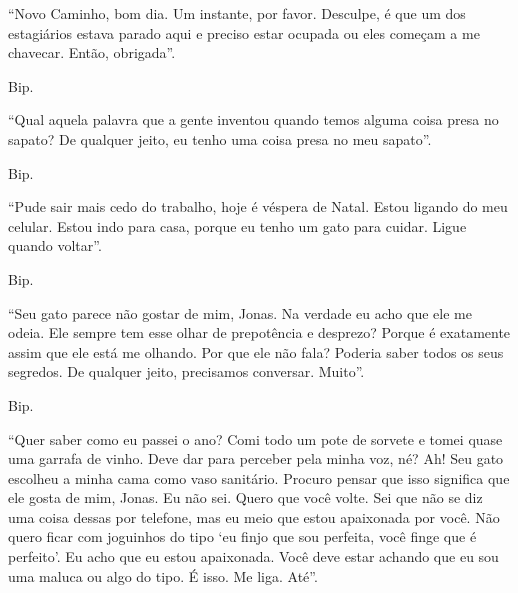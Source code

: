 ``Novo Caminho, bom dia. Um instante, por favor. Desculpe, é que um dos estagiários estava parado aqui e preciso estar ocupada ou eles começam a me chavecar. Então, obrigada''.

Bip.

``Qual aquela palavra que a gente inventou quando temos alguma coisa presa no sapato? De qualquer jeito, eu tenho uma coisa presa no meu sapato''.

Bip.

``Pude sair mais cedo do trabalho, hoje é véspera de Natal. Estou ligando do meu celular. Estou indo para casa, porque eu tenho um gato para cuidar. Ligue quando voltar''.

Bip.

``Seu gato parece não gostar de mim, Jonas. Na verdade\mudanca{,} eu acho que ele me odeia. Ele sempre tem esse olhar de prepotência e desprezo? Porque é exatamente assim que ele está me olhando. Por que ele não fala? Poderia saber todos os seus segredos. De qualquer jeito, precisamos conversar. Muito''.

Bip.

``Quer saber como eu passei o ano? Comi todo um pote de sorvete e tomei quase uma garrafa de vinho. Deve dar para perceber pela minha voz, né? Ah! Seu gato escolheu a minha cama como vaso sanitário. Procuro pensar que isso significa que ele gosta de mim, Jonas. Eu não sei. Quero que você volte. Sei que não se diz uma coisa dessas por telefone, mas eu meio que estou apaixonada por você. Não quero ficar com joguinhos do tipo `eu finjo que sou perfeita, você finge que é perfeito'. Eu acho que eu estou apaixonada. Você deve estar achando que eu sou uma maluca ou algo do tipo. É isso. Me liga. Até''.
